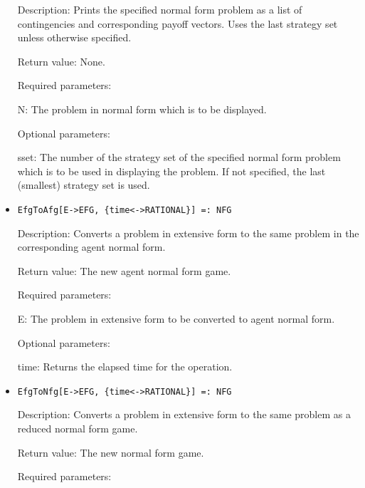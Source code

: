 \begin{itemize}
\bd
\item
[Description:] Prints the specified normal form problem as a list of
contingencies and corresponding payoff vectors.  Uses the last
strategy set unless otherwise specified.
\item
[Return value:] None.
\item
[Required parameters:]\hfil\null

\bd	
\item
[N:] The problem in normal form which is to be displayed.
\ed

\item
[Optional parameters:]\hfil\null

\bd
\item
[sset:] The number of the strategy set of the specified normal form
problem which is to be used in displaying the problem.  If not
specified, the last (smallest) strategy set is used.
\ed
\ed

\item
\protect \large \begin{verbatim}
EfgToAfg[E->EFG, {time<->RATIONAL}] =: NFG
\end{verbatim}\normalsize

\bd
\item
[Description:] Converts a problem in extensive form to the same
problem in the corresponding agent normal form.
\item
[Return value:] The new agent normal form game.
\item 
[Required parameters:]\hfil\null

\bd
\item
[E:] The problem in extensive form to be converted to agent normal
form.
\ed

\item
[Optional parameters:]\hfil\null
	
\bd
\item
[time:] Returns the elapsed time for the operation.
\ed
\ed

\item
\protect \large \begin{verbatim}
EfgToNfg[E->EFG, {time<->RATIONAL}] =: NFG
\end{verbatim}\normalsize

\bd
\item
[Description:] Converts a problem in extensive form to the same
problem as a reduced normal form game.
\item
[Return value:] The new normal form game.
\item
[Required parameters:]\hfil\null
	

\end{itemize}
